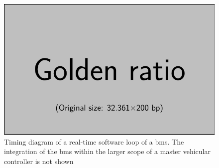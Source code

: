 \begin{figure}[htb]
    \centering
    \includegraphics[width=\textwidth]{placeholder_images/example-image-golden.pdf}
    \caption[Timing diagram of a real-time software loop of a \gls{bms}]
    {Timing diagram of a real-time software loop of a \gls{bms}. The integration  of the  \gls{bms} within  the larger  scope of  a master  vehicular controller is not shown}
    \label{fig:timingdiagramBig}
\end{figure}










